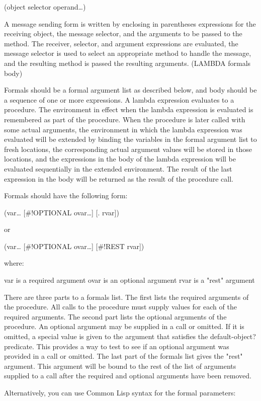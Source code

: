 \documentclass[11pt]{article}
\begin{document}
(object selector operand\ldots{})

A message sending form is written by enclosing in parentheses
expressions for the receiving object, the message selector, and the
arguments to be passed to the method. The receiver, selector, and
argument expressions are evaluated, the message selector is used to
select an appropriate method to handle the message, and the resulting
method is passed the resulting arguments.  (LAMBDA formals body)

Formals should be a formal argument list as described below, and body
should be a sequence of one or more expressions. A lambda expression
evaluates to a procedure. The environment in effect when the lambda
expression is evaluated is remembered as part of the procedure. When the
procedure is later called with some actual arguments, the environment in
which the lambda expression was evaluated will be extended by binding
the variables in the formal argument list to fresh locations, the
corresponding actual argument values will be stored in those locations,
and the expressions in the body of the lambda expression will be
evaluated sequentially in the extended environment. The result of the
last expression in the body will be returned as the result of the
procedure call.

Formals should have the following form:

(var\ldots{} [\#!OPTIONAL ovar\ldots{}] [. rvar])

or

(var\ldots{} [\#!OPTIONAL ovar\ldots{}] [\#!REST rvar])

where:

var is a required argument
ovar is an optional argument
rvar is a "rest" argument

There are three parts to a formals list. The first lists the required
arguments of the procedure. All calls to the procedure must supply
values for each of the required arguments. The second part lists the
optional arguments of the procedure. An optional argument may be
supplied in a call or omitted. If it is omitted, a special value is
given to the argument that satisfies the default-object? predicate. This
provides a way to test to see if an optional argument was provided in a
call or omitted. The last part of the formals list gives the "rest"
argument. This argument will be bound to the rest of the list of
arguments supplied to a call after the required and optional arguments
have been removed.

Alternatively, you can use Common Lisp syntax for the formal parameters:
\end{document}
